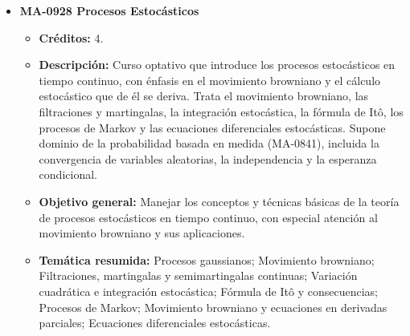 \begin{itemize}[leftmargin=1.3em, itemsep=10pt, topsep=4pt, label={\color{Azul-UCR}$\blacksquare$}]
\item {\color{Azul-UCR}\textbf{MA-0928 Procesos Estocásticos}}\par\nopagebreak\smallskip
\begin{itemize}[leftmargin=1.1em, itemsep=3pt, topsep=2pt, parsep=2pt, label={\textendash}]
\item \textbf{Créditos:} 4.
\item \textbf{Descripción:} Curso optativo que introduce los procesos estocásticos en tiempo continuo, con énfasis en el movimiento browniano y el cálculo estocástico que de él se deriva. Trata el movimiento browniano, las filtraciones y martingalas, la integración estocástica, la fórmula de Itô, los procesos de Markov y las ecuaciones diferenciales estocásticas. Supone dominio de la probabilidad basada en medida (MA-0841), incluida la convergencia de variables aleatorias, la independencia y la esperanza condicional.
\item \textbf{Objetivo general:} Manejar los conceptos y técnicas básicas de la teoría de procesos estocásticos en tiempo continuo, con especial atención al movimiento browniano y sus aplicaciones.
\item \textbf{Temática resumida:} Procesos gaussianos; Movimiento browniano; Filtraciones, martingalas y semimartingalas continuas; Variación cuadrática e integración estocástica; Fórmula de Itô y consecuencias; Procesos de Markov; Movimiento browniano y ecuaciones en derivadas parciales; Ecuaciones diferenciales estocásticas.
\end{itemize}

\end{itemize}
\endgroup
